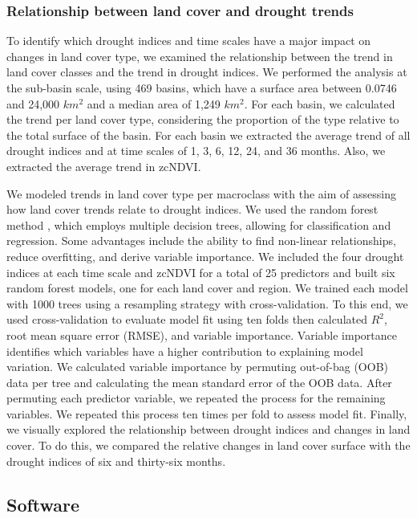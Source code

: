 \documentclass[
  sn-nature,
  numbered]{sn-jnl}
\begin{document}
\subsubsection{Relationship between land cover and drought
trends}\label{relationship-between-land-cover-and-drought-trends}

To identify which drought indices and time scales have a major impact on
changes in land cover type, we examined the relationship between the
trend in land cover classes and the trend in drought indices. We
performed the analysis at the sub-basin scale, using 469 basins, which
have a surface area between 0.0746 and 24,000 \(km^2\) and a median area
of 1,249 \(km^2\). For each basin, we calculated the trend per land
cover type, considering the proportion of the type relative to the total
surface of the basin. For each basin we extracted the average trend of
all drought indices and at time scales of 1, 3, 6, 12, 24, and 36
months. Also, we extracted the average trend in zcNDVI.

We modeled trends in land cover type per macroclass with the aim of
assessing how land cover trends relate to drought indices. We used the
random forest method \citep{Ho1995}, which employs multiple decision
trees, allowing for classification and regression. Some advantages
include the ability to find non-linear relationships, reduce
overfitting, and derive variable importance. We included the four
drought indices at each time scale and zcNDVI for a total of 25
predictors and built six random forest models, one for each land cover
and region. We trained each model with 1000 trees using a resampling
strategy with cross-validation. To this end, we used cross-validation to
evaluate model fit using ten folds then calculated \(R^2\), root mean
square error (RMSE), and variable importance. Variable importance
identifies which variables have a higher contribution to explaining
model variation. We calculated variable importance by permuting
out-of-bag (OOB) data per tree and calculating the mean standard error
of the OOB data. After permuting each predictor variable, we repeated
the process for the remaining variables. We repeated this process ten
times per fold to assess model fit. Finally, we visually explored the
relationship between drought indices and changes in land cover. To do
this, we compared the relative changes in land cover surface with the
drought indices of six and thirty-six months.

\subsection{Software}\label{software}
\end{document}
